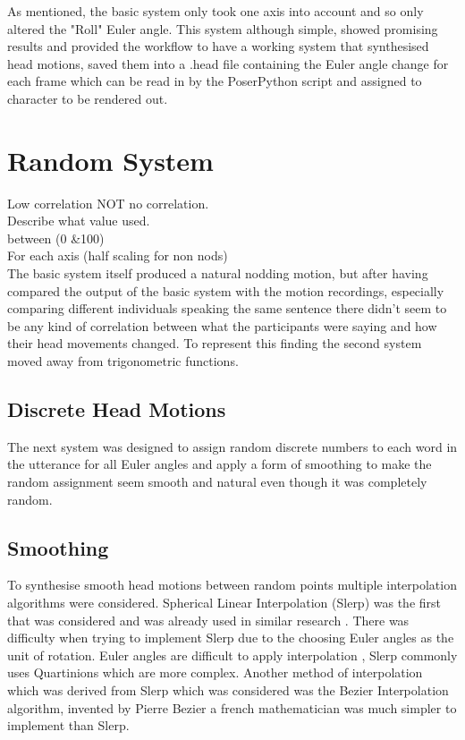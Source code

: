 \documentclass[bsc,frontabs,twoside,singlespacing,parskip]{infthesis}
\begin{document}

As mentioned, the basic system only took one axis into account and so only altered the "Roll" Euler angle. This system although simple, showed promising results and provided the workflow to have a working system that synthesised head motions, saved them into a .head file containing the Euler angle change for each frame which can be read in by the PoserPython script and assigned to character to be rendered out.

\section{Random System}

Low correlation NOT no correlation.\\
Describe what value used. \\ between (0 \&100)\\
For each axis (half scaling for non nods)\\

The basic system itself produced a natural nodding motion, but after having compared the output of the basic system with the motion recordings, especially comparing different individuals speaking the same sentence there didn't seem to be any kind of correlation between what the participants were saying and how their head movements changed. To represent this finding the second system moved away from trigonometric functions.

\subsection{Discrete Head Motions}

The next system was designed to assign random discrete numbers to each word in the utterance for all Euler angles and apply a form of smoothing to make the random assignment seem smooth and natural even though it was completely random. 

\subsection{Smoothing}

To synthesise smooth head motions between random points multiple interpolation algorithms were considered. Spherical Linear Interpolation (Slerp) was the first that was considered and was already used in similar research \cite{rigid_head_motion}. There was difficulty when trying to implement Slerp due to the choosing Euler angles as the unit of rotation. Euler angles are difficult to apply interpolation \cite{quartionions}, Slerp commonly uses Quartinions which are more complex. Another method of interpolation which was derived from Slerp which was considered was the Bezier Interpolation algorithm, invented by Pierre Bezier a french mathematician was much simpler to implement than Slerp.
\end{document}
